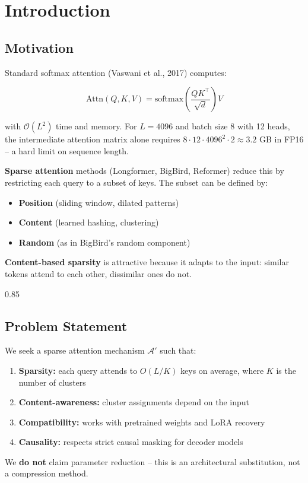 
\section{Introduction}

\subsection{Motivation}

Standard softmax attention (Vaswani et al., 2017) computes:

\[
\text{Attn}(Q, K, V) = \text{softmax}\!\left(\frac{Q K^\top}{\sqrt{d}}\right) V
\tag{1.1}
\]

with $\mathcal{O}(L^2)$ time and memory. For $L = 4096$ and batch size 8 with 
12 heads, the intermediate attention matrix alone requires 
$8 \cdot 12 \cdot 4096^2 \cdot 2 \approx 3.2$ GB in FP16 -- a hard limit on 
sequence length.

\textbf{Sparse attention} methods (Longformer, BigBird, Reformer) reduce this by 
restricting each query to a subset of keys. The subset can be defined by:

\begin{itemize}
\item \textbf{Position} (sliding window, dilated patterns)
\item \textbf{Content} (learned hashing, clustering)
\item \textbf{Random} (as in BigBird's random component)

\end{itemize}
\textbf{Content-based sparsity} is attractive because it adapts to the input: 
similar tokens attend to each other, dissimilar ones do not.

0.85


\subsection{Problem Statement}

We seek a sparse attention mechanism $\mathcal{A}'$ such that:

\begin{enumerate}
\item \textbf{Sparsity:} each query attends to $O(L/K)$ keys on average, where $K$
  is the number of clusters
\item \textbf{Content-awareness:} cluster assignments depend on the input
\item \textbf{Compatibility:} works with pretrained weights and LoRA recovery
\item \textbf{Causality:} respects strict causal masking for decoder models

\end{enumerate}
We \textbf{do not} claim parameter reduction -- this is an architectural 
substitution, not a compression method.

